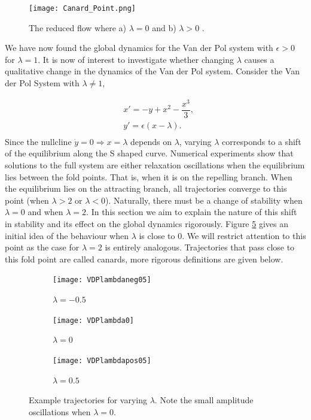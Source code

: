 \begin{figure}[h!]
	\centering
	\texttt{[image: Canard\_Point.png]}
	\caption{The reduced flow where a) $\lambda=0$ and b) $\lambda>0$ \citep{krupa2001}.}
	\label{fig: Canard Point}
\end{figure}

We have now found the global dynamics for the Van der Pol system with $\epsilon >0$ for $\lambda =1$. It is now of interest to investigate whether changing $\lambda$ causes a qualitative change in the dynamics of the Van der Pol system. Consider the Van der Pol System with $\lambda \neq 1$,

\begin{equation}
\begin{aligned}
&x'=-y+x^2-\dfrac{x^3}{3},\\
&y'=\epsilon(x-\lambda).\\
\end{aligned}
\label{eq: canard system}
\end{equation}
Since the nullcline $\dot{y}=0 \Rightarrow x=\lambda$ depends on $\lambda$, varying $\lambda$ corresponds to a shift of the equilibrium along the S shaped curve. Numerical experiments show that solutions to the full system are either relaxation oscillations when the equilibrium lies between the fold points. That is, when it is on the repelling branch. When the equilibrium lies on the attracting branch, all trajectories converge to this point (when $\lambda>2$ or $\lambda<0$). Naturally, there must be a change of stability when $\lambda=0$ and when $\lambda=2$. In this section we aim to explain the nature of this shift in stability and its effect on the global dynamics rigorously. Figure \ref{fig:varLambda} gives an initial idea of the behaviour when $\lambda$ is close to 0. We will restrict attention to this point as the case for $\lambda=2$ is entirely analogous. Trajectories that pass close to this fold point are called canards, more rigorous definitions are given below.\\
 

\begin{figure}[h!]
	\centering
	\begin{subfigure}[t]{0.33\textwidth}
		\centering
		\texttt{[image: VDPlambdaneg05]}
		\caption{$\lambda=-0.5$}
		\label{}
	\end{subfigure}
	\hfill
		\begin{subfigure}[t]{0.32\textwidth}
		\texttt{[image: VDPlambda0]}
		\caption{$\lambda=0$}
		\label{} 
	\end{subfigure}
\hfill
	\begin{subfigure}[t]{0.33\textwidth}
		\texttt{[image: VDPlambdapos05]}
		\caption{$\lambda=0.5$}
		\label{} 
	\end{subfigure}
	\caption[Example trajectories for varying $\lambda$]{Example trajectories for varying $\lambda$. Note the small amplitude oscillations when $\lambda=0$. }
	\label{fig:varLambda}
\end{figure}\newpage

